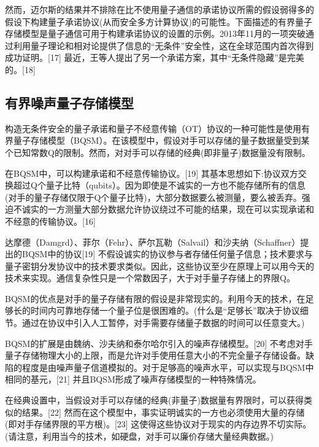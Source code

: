 然而，迈尔斯的结果并不排除在比不使用量子通信的承诺协议所需的假设弱得多的假设下构建量子承诺协议(从而安全多方计算协议)的可能性。下面描述的有界量子存储模型是量子通信可用于构建承诺协议的设置的示例。2013年11月的一项突破通过利用量子理论和相对论提供了信息的“无条件”安全性，这在全球范围内首次得到成功证明。[17] 最近，王等人提出了另一个承诺方案，其中“无条件隐藏”是完美的。[18]

\subsection{有界噪声量子存储模型}
构造无条件安全的量子承诺和量子不经意传输（OT）协议的一种可能性是使用有界量子存储模型（BQSM）。在该模型中，假设对手可以存储的量子数据量受到某个已知常数Q的限制。然而，对对手可以存储的经典(即非量子)数据量没有限制。

在BQSM中，可以构建承诺和不经意传输协议。[19] 其基本思想如下:协议双方交换超过Q个量子比特（qubits）。因为即使是不诚实的一方也不能存储所有的信息(对手的量子存储仅限于Q个量子比特)，大部分数据要么被测量，要么被丢弃。强迫不诚实的一方测量大部分数据允许协议绕过不可能的结果，现在可以实现承诺和不经意的传输协议。[16]

达摩德（Damgrd）、菲尔（Fehr）、萨尔瓦勒（Salvail）和沙夫纳（Schaffner）提出的BQSM中的协议[19] 不假设诚实的协议参与者存储任何量子信息；技术要求与量子密钥分发协议中的技术要求类似。因此，这些协议至少在原理上可以用今天的技术来实现。通信复杂性只是一个常数因子，大于对手量子存储上的界限Q。

BQSM的优点是对手的量子存储有限的假设是非常现实的。利用今天的技术，在足够长的时间内可靠地存储一个量子位是很困难的。(什么是“足够长”取决于协议细节。通过在协议中引入人工暂停，对手需要存储量子数据的时间可以任意变大。)

BQSM的扩展是由魏纳、沙夫纳和泰尔哈尔引入的噪声存储模型。[20] 不考虑对手量子存储物理大小的上限，而是允许对手使用任意大小的不完全量子存储设备。缺陷的程度是由噪声量子信道模拟的。对于足够高的噪声水平，可以实现与BQSM中相同的基元，[21] 并且BQSM形成了噪声存储模型的一种特殊情况。

在经典设置中，当假设对手可以存储的经典(非量子)数据量有界限时，可以获得类似的结果。[22] 然而在这个模型中，事实证明诚实的一方也必须使用大量的存储(即对手存储界限的平方根)。[23] 这使得这些协议对于现实的内存边界不切实际。(请注意，利用当今的技术，如硬盘，对手可以廉价存储大量经典数据。)

